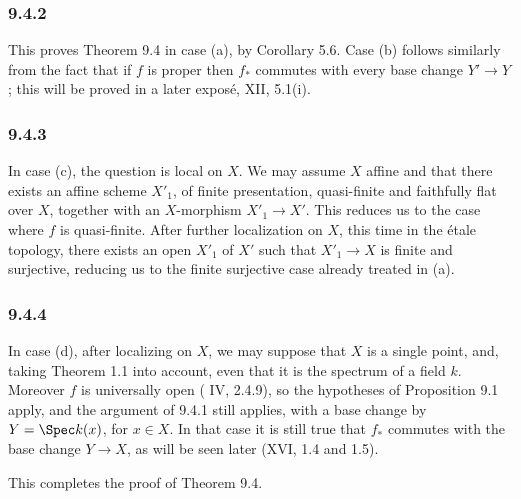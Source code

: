 \subsubsection*{9.4.2}
This proves Theorem 9.4 in case (a), by Corollary 5.6. Case (b) follows similarly from the fact that if \(f\) is proper then \(f_*\) commutes with every base change \(Y'\to Y\); this will be proved in a later expos\'e, XII, 5.1(i).

\subsubsection*{9.4.3}
In case (c), the question is local on \(X\). We may assume \(X\) affine and that there exists an affine scheme \(X'_1\), of finite presentation, quasi-finite and faithfully flat over \(X\), together with an \(X\)-morphism \(X'_1\to X'\). This reduces us to the case where \(f\) is quasi-finite. After further localization on \(X\), this time in the \'etale topology, there exists an open \(X'_1\) of \(X'\) such that \(X'_1\to X\) is finite and surjective, reducing us to the finite surjective case already treated in (a).

\subsubsection*{9.4.4}
In case (d), after localizing on \(X\), we may suppose that \(X\) is a single point, and, taking Theorem 1.1 into account, even that it is the spectrum of a field \(k\). Moreover \(f\) is universally open (\EGA{} IV, 2.4.9), so the hypotheses of Proposition 9.1 apply, and the argument of 9.4.1 still applies, with a base change by \(Y=\Spec k(x)\), for \(x\in X\). In that case it is still true that \(f_*\) commutes with the base change \(Y\to X\), as will be seen later (XVI, 1.4 and 1.5).

This completes the proof of Theorem 9.4.
